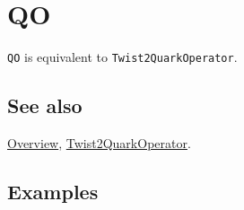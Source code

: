 \documentclass[../FeynCalcManual.tex]{subfiles}
\begin{document}
\hypertarget{qo}{%
\section{QO}\label{qo}}

\texttt{QO} is equivalent to \texttt{Twist2QuarkOperator}.

\subsection{See also}

\hyperlink{toc}{Overview},
\hyperlink{twist2quarkoperator}{Twist2QuarkOperator}.

\subsection{Examples}
\end{document}
